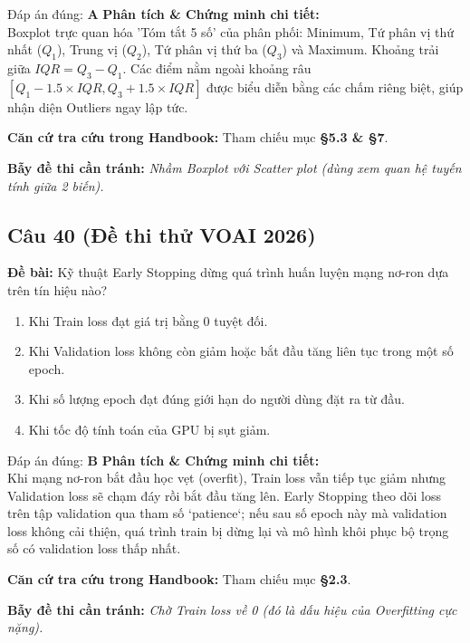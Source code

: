 \documentclass[10pt,a4paper]{article}
\begin{document}
\begin{solbox}{Đáp án đúng: \textbf{A}}
\textbf{Phân tích \& Chứng minh chi tiết:} \\
Boxplot trực quan hóa 'Tóm tắt 5 số' của phân phối: Minimum, Tứ phân vị thứ nhất ($Q_1$), Trung vị ($Q_2$), Tứ phân vị thứ ba ($Q_3$) và Maximum. Khoảng trải giữa $IQR = Q_3 - Q_1$. Các điểm nằm ngoài khoảng râu $[Q_1 - 1.5 \times IQR, Q_3 + 1.5 \times IQR]$ được biểu diễn bằng các chấm riêng biệt, giúp nhận diện Outliers ngay lập tức.

\vspace{0.4em}
\textbf{Căn cứ tra cứu trong Handbook:} Tham chiếu mục \textbf{§5.3 \& §7}.

\vspace{0.4em}
\textbf{Bẫy đề thi cần tránh:} \textit{Nhầm Boxplot với Scatter plot (dùng xem quan hệ tuyến tính giữa 2 biến).}
\end{solbox}
\vspace{0.5em}


\subsection*{Câu 40 (Đề thi thử VOAI 2026)}
\textbf{Đề bài:} Kỹ thuật Early Stopping dừng quá trình huấn luyện mạng nơ-ron dựa trên tín hiệu nào?

\begin{enumerate}[label=\textbf{\Alph*.}]
    \item Khi Train loss đạt giá trị bằng 0 tuyệt đối.
    \item Khi Validation loss không còn giảm hoặc bắt đầu tăng liên tục trong một số epoch.
    \item Khi số lượng epoch đạt đúng giới hạn do người dùng đặt ra từ đầu.
    \item Khi tốc độ tính toán của GPU bị sụt giảm.
\end{enumerate}

\begin{solbox}{Đáp án đúng: \textbf{B}}
\textbf{Phân tích \& Chứng minh chi tiết:} \\
Khi mạng nơ-ron bắt đầu học vẹt (overfit), Train loss vẫn tiếp tục giảm nhưng Validation loss sẽ chạm đáy rồi bắt đầu tăng lên. Early Stopping theo dõi loss trên tập validation qua tham số `patience`; nếu sau số epoch này mà validation loss không cải thiện, quá trình train bị dừng lại và mô hình khôi phục bộ trọng số có validation loss thấp nhất.

\vspace{0.4em}
\textbf{Căn cứ tra cứu trong Handbook:} Tham chiếu mục \textbf{§2.3}.

\vspace{0.4em}
\textbf{Bẫy đề thi cần tránh:} \textit{Chờ Train loss về 0 (đó là dấu hiệu của Overfitting cực nặng).}
\end{solbox}
\vspace{0.5em}
\end{document}
